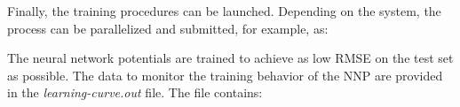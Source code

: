 \documentclass[12pt]{article}
\begin{document}
%
Finally, the training procedures can be launched. Depending on the system, the process can be parallelized and submitted, for example, as:
\begin{center}
\end{center}
The neural network potentials are trained to achieve as low RMSE on the test set as possible. The data to monitor the training behavior of the NNP are provided in the \textit{learning-curve.out} file. The file contains:
\end{document}

